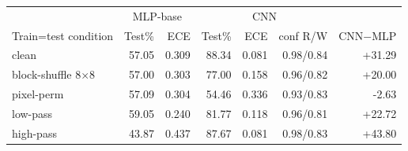 \begin{tabular}{lrrrrrr}
\toprule
 & \multicolumn{2}{c}{MLP-base} & \multicolumn{3}{c}{CNN} & \\
Train=test condition & Test\% & ECE & Test\% & ECE & conf R/W & CNN$-$MLP \\
\midrule
clean & 57.05 & 0.309 & 88.34 & 0.081 & 0.98/0.84 & +31.29 \\
block-shuffle 8$\times$8 & 57.00 & 0.303 & 77.00 & 0.158 & 0.96/0.82 & +20.00 \\
pixel-perm & 57.09 & 0.304 & 54.46 & 0.336 & 0.93/0.83 & -2.63 \\
low-pass & 59.05 & 0.240 & 81.77 & 0.118 & 0.96/0.81 & +22.72 \\
high-pass & 43.87 & 0.437 & 87.67 & 0.081 & 0.98/0.83 & +43.80 \\
\bottomrule
\end{tabular}
